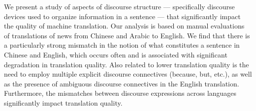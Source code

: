 We present a study of aspects of discourse structure --- specifically discourse devices used to organize information in a sentence --- that significantly impact the quality of machine translation. Our analysis is based on manual evaluations of translations of news from Chinese and Arabic to English. We find that there is a particularly strong mismatch in the notion of what constitutes a sentence in Chinese and English, which occurs often and is associated with significant degradation in translation quality. Also related to lower translation quality is the need to employ multiple explicit discourse connectives (because, but, etc.), as well as the presence of ambiguous discourse connectives in the English translation. Furthermore, the mismatches between discourse expressions across languages significantly impact translation quality.
